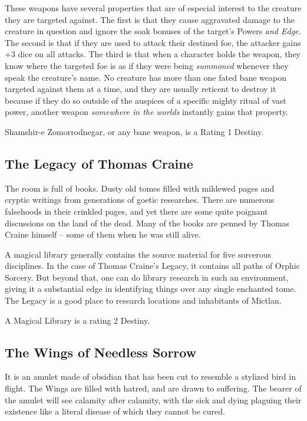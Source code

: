 These weapons have several properties that are of especial interest to the creature they are targeted against. The first is that they cause aggravated damage to the creature in question and ignore the soak bonuses of the target's Powers \textit{and Edge}. The second is that if they are used to attack their destined foe, the attacker gains +3 dice on all attacks. The third is that when a character holds the weapon, they know where the targeted foe is as if they were being \textit{summoned} whenever they speak the creature's name. No creature has more than one fated bane weapon targeted against them at a time, and they are usually reticent to destroy it because if they do so outside of the auspices of a specific mighty ritual of vast power, another weapon \textit{somewhere in the worlds} instantly gains that property.

Shamshir-e Zomorrodnegar, or any bane weapon, is a Rating 1 Destiny.

\subsection{The Legacy of Thomas Craine}
\hspace{\parindent} The room is full of books. Dusty old tomes filled with mildewed pages and cryptic writings from generations of goetic researches. There are numerous falsehoods in their crinkled pages, and yet there are some quite poignant discussions on the land of the dead. Many of the books are penned by Thomas Craine himself -- some of them when he was still alive.

A magical library generally contains the source material for five sorcerous disciplines. In the case of Thomas Craine's Legacy, it contains all paths of Orphic Sorcery. But beyond that, one can do library research in such an environment, giving it a substantial edge in identifying things over any single enchanted tome. The Legacy is a good place to research locations and inhabitants of Mictlan.

A Magical Library is a rating 2 Destiny.

\subsection{The Wings of Needless Sorrow}
\hspace{\parindent} It is an amulet made of obsidian that has been cut to resemble a stylized bird in flight. The Wings are filled with hatred, and are drawn to suffering. The bearer of the amulet will see calamity after calamity, with the sick and dying plaguing their existence like a literal disease of which they cannot be cured.

